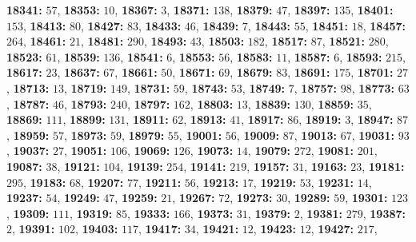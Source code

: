 \textsf{\bfseries 18341:} $57$, \textsf{\bfseries 18353:} $10$, \textsf{\bfseries 18367:} $3$, \textsf{\bfseries 18371:} $138$, \textsf{\bfseries 18379:} $47$, \textsf{\bfseries 18397:} $135$, \textsf{\bfseries 18401:} $153$, \textsf{\bfseries 18413:} $80$, \textsf{\bfseries 18427:} $83$, \textsf{\bfseries 18433:} $46$, \textsf{\bfseries 18439:} $7$, \textsf{\bfseries 18443:} $55$, \textsf{\bfseries 18451:} $18$, \textsf{\bfseries 18457:} $264$, \textsf{\bfseries 18461:} $21$, \textsf{\bfseries 18481:} $290$, \textsf{\bfseries 18493:} $43$, \textsf{\bfseries 18503:} $182$, \textsf{\bfseries 18517:} $87$, \textsf{\bfseries 18521:} $280$, \textsf{\bfseries 18523:} $61$, \textsf{\bfseries 18539:} $136$, \textsf{\bfseries 18541:} $6$, \textsf{\bfseries 18553:} $56$, \textsf{\bfseries 18583:} $11$, \textsf{\bfseries 18587:} $6$, \textsf{\bfseries 18593:} $215$, \textsf{\bfseries 18617:} $23$, \textsf{\bfseries 18637:} $67$, \textsf{\bfseries 18661:} $50$, \textsf{\bfseries 18671:} $69$, \textsf{\bfseries 18679:} $83$, \textsf{\bfseries 18691:} $175$, \textsf{\bfseries 18701:} $27$, \textsf{\bfseries 18713:} $13$, \textsf{\bfseries 18719:} $149$, \textsf{\bfseries 18731:} $59$, \textsf{\bfseries 18743:} $53$, \textsf{\bfseries 18749:} $7$, \textsf{\bfseries 18757:} $98$, \textsf{\bfseries 18773:} $63$, \textsf{\bfseries 18787:} $46$, \textsf{\bfseries 18793:} $240$, \textsf{\bfseries 18797:} $162$, \textsf{\bfseries 18803:} $13$, \textsf{\bfseries 18839:} $130$, \textsf{\bfseries 18859:} $35$, \textsf{\bfseries 18869:} $111$, \textsf{\bfseries 18899:} $131$, \textsf{\bfseries 18911:} $62$, \textsf{\bfseries 18913:} $41$, \textsf{\bfseries 18917:} $86$, \textsf{\bfseries 18919:} $3$, \textsf{\bfseries 18947:} $87$, \textsf{\bfseries 18959:} $57$, \textsf{\bfseries 18973:} $59$, \textsf{\bfseries 18979:} $55$, \textsf{\bfseries 19001:} $56$, \textsf{\bfseries 19009:} $87$, \textsf{\bfseries 19013:} $67$, \textsf{\bfseries 19031:} $93$, \textsf{\bfseries 19037:} $27$, \textsf{\bfseries 19051:} $106$, \textsf{\bfseries 19069:} $126$, \textsf{\bfseries 19073:} $14$, \textsf{\bfseries 19079:} $272$, \textsf{\bfseries 19081:} $201$, \textsf{\bfseries 19087:} $38$, \textsf{\bfseries 19121:} $104$, \textsf{\bfseries 19139:} $254$, \textsf{\bfseries 19141:} $219$, \textsf{\bfseries 19157:} $31$, \textsf{\bfseries 19163:} $23$, \textsf{\bfseries 19181:} $295$, \textsf{\bfseries 19183:} $68$, \textsf{\bfseries 19207:} $77$, \textsf{\bfseries 19211:} $56$, \textsf{\bfseries 19213:} $17$, \textsf{\bfseries 19219:} $53$, \textsf{\bfseries 19231:} $14$, \textsf{\bfseries 19237:} $54$, \textsf{\bfseries 19249:} $47$, \textsf{\bfseries 19259:} $21$, \textsf{\bfseries 19267:} $72$, \textsf{\bfseries 19273:} $30$, \textsf{\bfseries 19289:} $59$, \textsf{\bfseries 19301:} $123$, \textsf{\bfseries 19309:} $111$, \textsf{\bfseries 19319:} $85$, \textsf{\bfseries 19333:} $166$, \textsf{\bfseries 19373:} $31$, \textsf{\bfseries 19379:} $2$, \textsf{\bfseries 19381:} $279$, \textsf{\bfseries 19387:} $2$, \textsf{\bfseries 19391:} $102$, \textsf{\bfseries 19403:} $117$, \textsf{\bfseries 19417:} $34$, \textsf{\bfseries 19421:} $12$, \textsf{\bfseries 19423:} $12$, \textsf{\bfseries 19427:} $217$, 
